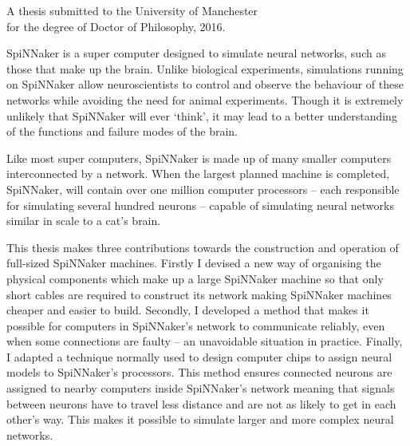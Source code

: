 {
	
	
	
	\vfill
	
	\begin{center}
		\textsc{\large\thesistitle}
		
		\vspace{0.5em}
		
		\thesisauthor
		
		\vspace{0.5em}
		
		A thesis submitted to the University of Manchester\\
		for the degree of Doctor of Philosophy, 2016.
	\end{center}
	
	\vfill
	
	
	SpiNNaker is a super computer designed to simulate neural networks, such as
	those that make up the brain. Unlike biological experiments, simulations
	running on SpiNNaker allow neuroscientists to control and observe the
	behaviour of these networks while avoiding the need for animal experiments.
	Though it is extremely unlikely that SpiNNaker will ever `think', it may lead
	to a better understanding of the functions and failure modes of the brain.
	
	Like most super computers, SpiNNaker is made up of many smaller computers
	interconnected by a network. When the largest planned machine is completed,
	SpiNNaker, will contain over one million computer processors -- each
	responsible for simulating several hundred neurons -- capable of simulating
	neural networks similar in scale to a cat's brain.
	
	This thesis makes three contributions towards the construction and operation
	of full-sized SpiNNaker machines. Firstly I devised a new way of organising
	the physical components which make up a large SpiNNaker machine so that
	only short cables are required to construct its network making SpiNNaker
	machines cheaper and easier to build. Secondly, I developed a method that
	makes it possible for computers in SpiNNaker's network to communicate
	reliably, even when some connections are faulty -- an unavoidable situation
	in practice.  Finally, I adapted a technique normally used to design computer
	chips to assign neural models to SpiNNaker's processors. This method ensures
	connected neurons are assigned to nearby computers inside SpiNNaker's network
	meaning that signals between neurons have to travel less distance and are not
	as likely to get in each other's way. This makes it possible to simulate
	larger and more complex neural networks.
	
	\par%
}
